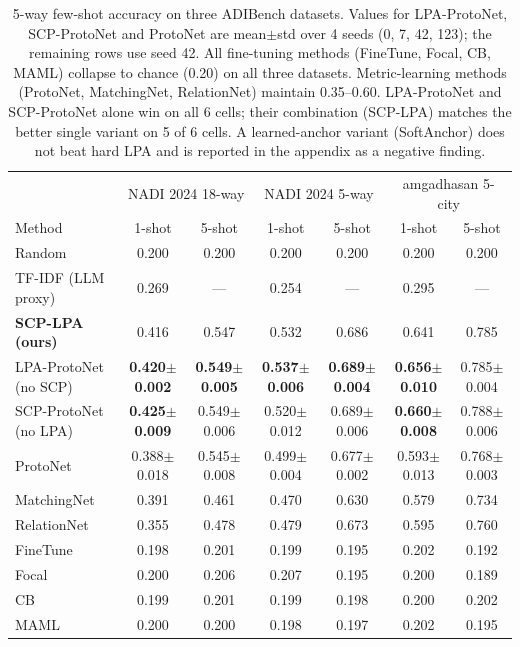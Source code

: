 \documentclass[11pt,a4paper,twocolumn]{article}
\newcommand{\bench}{ADIBench}
\begin{document}
\begin{table}[t]
\centering\small
\begin{tabular}{lcccccc}
\toprule
& \multicolumn{2}{c}{NADI 2024 18-way} & \multicolumn{2}{c}{NADI 2024 5-way} & \multicolumn{2}{c}{amgadhasan 5-city} \\
\cmidrule(lr){2-3} \cmidrule(lr){4-5} \cmidrule(lr){6-7}
Method & 1-shot & 5-shot & 1-shot & 5-shot & 1-shot & 5-shot \\
\midrule
Random & 0.200 & 0.200 & 0.200 & 0.200 & 0.200 & 0.200 \\
TF-IDF (LLM proxy) & 0.269 & --- & 0.254 & --- & 0.295 & --- \\
\midrule
\textbf{SCP-LPA (ours)} & 0.416 & 0.547 & 0.532 & 0.686 & 0.641 & 0.785 \\
\makecell[l]{LPA-ProtoNet\\ (no SCP)}  & \textbf{0.420$\pm$0.002} & \textbf{0.549$\pm$0.005} & \textbf{0.537$\pm$0.006} & \textbf{0.689$\pm$0.004} & \textbf{0.656$\pm$0.010} & 0.785$\pm$0.004 \\
\makecell[l]{SCP-ProtoNet\\ (no LPA)}  & \textbf{0.425$\pm$0.009} & 0.549$\pm$0.006 & 0.520$\pm$0.012 & 0.689$\pm$0.006 & \textbf{0.660$\pm$0.008} & 0.788$\pm$0.006 \\
ProtoNet     & 0.388$\pm$0.018 & 0.545$\pm$0.008 & 0.499$\pm$0.004 & 0.677$\pm$0.002 & 0.593$\pm$0.013 & 0.768$\pm$0.003 \\
MatchingNet  & 0.391 & 0.461 & 0.470 & 0.630 & 0.579 & 0.734 \\
RelationNet  & 0.355 & 0.478 & 0.479 & 0.673 & 0.595 & 0.760 \\
\midrule
FineTune     & 0.198 & 0.201 & 0.199 & 0.195 & 0.202 & 0.192 \\
Focal        & 0.200 & 0.206 & 0.207 & 0.195 & 0.200 & 0.189 \\
CB           & 0.199 & 0.201 & 0.199 & 0.198 & 0.200 & 0.202 \\
MAML         & 0.200 & 0.200 & 0.198 & 0.197 & 0.202 & 0.195 \\
\bottomrule
\end{tabular}
\caption{5-way few-shot accuracy on three \bench{} datasets.
Values for LPA-ProtoNet, SCP-ProtoNet and ProtoNet are
mean$\pm$std over 4 seeds (0, 7, 42, 123); the remaining rows
use seed 42. All fine-tuning methods (FineTune, Focal, CB,
MAML) collapse to chance (0.20) on all three datasets.
Metric-learning methods (ProtoNet, MatchingNet, RelationNet)
maintain 0.35--0.60. LPA-ProtoNet and SCP-ProtoNet alone win on
all 6 cells; their combination (SCP-LPA) matches the better
single variant on 5 of 6 cells. A learned-anchor variant
(SoftAnchor) does not beat hard LPA and is reported in the
appendix as a negative finding.}
\label{tab:main}
\end{table}
\end{document}

